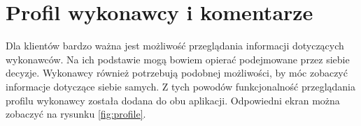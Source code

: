 \section{Profil wykonawcy i komentarze}

Dla klientów bardzo ważna jest możliwość przeglądania informacji dotyczących wykonawców. Na ich podstawie mogą bowiem opierać podejmowane przez siebie decyzje. Wykonawcy również potrzebują podobnej możliwości, by móc zobaczyć informacje dotyczące siebie samych. Z tych powodów funkcjonalność przeglądania profilu wykonawcy została dodana do obu aplikacji. Odpowiedni ekran można zobaczyć na rysunku \ref{fig:profile}.

\begin{figure}[ht!]
  \captionsetup[subfigure]{justification=centering}
  \centering
  \begin{subfigure}[t]{0.32\textwidth}
    \centering

\end{subfigure}
\end{figure}
